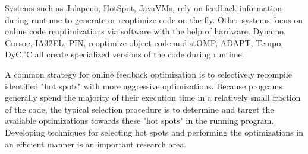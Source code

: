 Systems such as  Jalapeno, HotSpot, JavaVMs, rely on feedback 
information during runtume to generate or reoptimize code on the fly. 
Other systems focus on online code reoptimizations via software with the  
help of hardware. Dynamo, Cursoe, IA32EL, PIN, reoptimize
object code and stOMP, ADAPT, Tempo, DyC,'C all create specialized versions 
of the code during runtime.
 
A common strategy for online feedback optimization is to selectively recompile
identified "hot spots" with more aggressive optimizations.  Because programs
generally spend the majority of their execution time in a relatively small
fraction of the code, the typical selection procedure is to determine and
target the available optimizations towards these "hot spots" in the running
program.  Developing techniques for selecting hot spots and performing the
optimizations in an efficient manner is an important research area.
